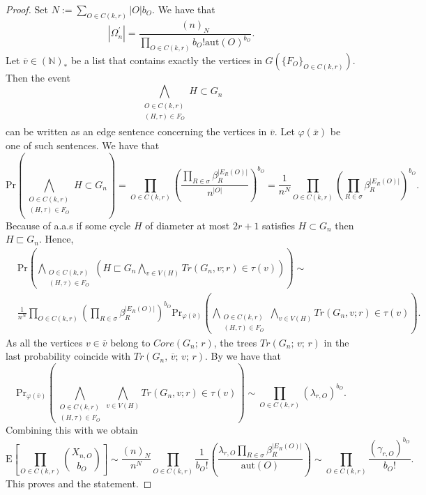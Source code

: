 \documentclass[12pt,notitlepage,a4paper]{article}
\theoremstyle{definition}
\newcommand{\N}{\mathbb{N}}
\newcommand{\aut}{\mathrm{aut}}
\begin{document}
\begin{proof}
Set $N:=\sum_{O\in C(k,r)} |O|  b_O$. We have that
\begin{equation} \label{eq:cycl_aux2}
|\Omega_n^{\prime}|=
\frac{(n)_N}
{\prod_{O\in C(k,r)} b_O!  \aut(O)^{b_O}}.
\end{equation}
Let $\overline{v}\in (\N)_*$ be 
a list that contains exactly the vertices in $G\left(
\{F_O\}_{O\in C(k,r)}	\right)$. Then the event
\[
\bigwedge_{
	\substack{
		O\in C(k,r)\\
		(H,\tau)\in F_O\\
}}
H\subset G_n
\]
can be written as an edge sentence concerning the vertices in $\overline{v}$.
Let $\varphi(\overline{x})$ be one of such sentences. We have that
\[
\mathrm{Pr}\left(
\bigwedge_{
	\substack{
		O\in C(k,r)\\
		(H,\tau)\in F_O\\
}}
H\subset G_n
\right)= \prod_{O\in C(k,r)} \left( \frac{\prod_{R\in \sigma}
\beta_R^{|E_R(O)|}}{n^{|O|}} \right)^{b_O}=
\frac{1}{n^N}  
\prod_{O\in C(k,r)} \left( \prod_{R\in \sigma}
\beta_R^{|E_R(O)|} \right)^{b_O}.
\]
Because of  a.a.s if some cycle $H$ of diameter at most
$2r+1$ satisfies $H\subset G_n$ then $H\sqsubset G_n$. Hence,
\begin{align}
\nonumber
&\mathrm{Pr}\left(
\bigwedge_{
	\substack{
		O\in C(k,r)\\
		(H,\tau)\in F_O
}}
\left(
H\sqsubset G_n
\bigwedge_{v\in V(H)}
Tr(G_n,v;r)\in \tau(v)
\right)
\right) \sim \\ \label{eq:cycl_aux3}
&\frac{1}{n^N}  
\prod_{O\in C(k,r)} \left( \prod_{R\in \sigma}
\beta_R^{|E_R(O)|} \right)^{b_O}  
\mathrm{Pr}_{\varphi(\overline{v})}\left(
\bigwedge_{
	\substack{
		O\in C(k,r)\\
		(H,\tau)\in F_O
}}
\bigwedge_{v\in V(H)}
Tr(G_n,v;r)\in \tau(v)
\right).
\end{align}
As all the vertices $v\in \overline{v}$ belong to $Core(G_n;\,r)$, the
trees $Tr(G_n;\,v;\,r)$ in the last probability coincide with 
$Tr(G_n,\,\overline{v};\, v;\, r)$. By 
we have that
\begin{equation*}
\mathrm{Pr}_{\varphi(\overline{v})}\left(
\bigwedge_{
	\substack{
		O\in C(k,r)\\
		(H,\tau)\in F_O
}}
\bigwedge_{v\in V(H)}
Tr(G_n,v;r)\in \tau(v)
\right) \sim 
\prod_{O\in C(k,r)} \left(
\lambda_{r,O}
\right)^{b_O}.
\end{equation*}
Combining this with  we obtain
\begin{equation*}
\mathrm{E}\left[
\prod_{O\in C(k,r)}
\binom{X_{n,O}}{b_O}
\right]\sim
\frac{(n)_N}{n^N}
\prod_{O\in C(k,r)}
\frac{1}{b_O!}
\left(
\frac{\lambda_{r,O} \prod_{R\in\sigma} \beta_R^{|E_R(O)|}}{\aut(O)}
\right) \sim \prod_{O\in C(k,r)} \frac{(\gamma_{r,O})^{b_O}}{b_O!}.
\end{equation*}
This proves  and the statement. 
\end{proof}
\end{document}
